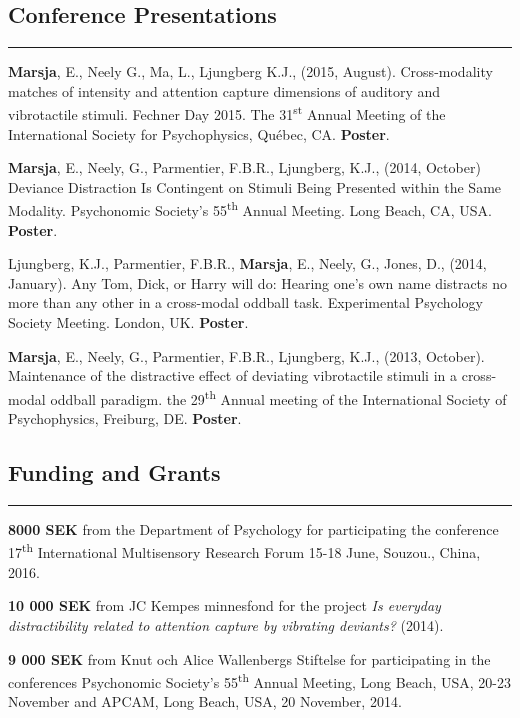 \documentclass[]{article}
\begin{document}
\subsection{Conference Presentations}\label{conference-presentations}

\hrule

\textbf{Marsja}, E., Neely G., Ma, L., Ljungberg K.J., (2015, August).
Cross-modality matches of intensity and attention capture dimensions of
auditory and vibrotactile stimuli. Fechner Day 2015. The
31\textsuperscript{st} Annual Meeting of the International Society for
Psychophysics, Québec, CA. \textbf{Poster}.

\textbf{Marsja}, E., Neely, G., Parmentier, F.B.R., Ljungberg, K.J.,
(2014, October) Deviance Distraction Is Contingent on Stimuli Being
Presented within the Same Modality. Psychonomic Society's
55\textsuperscript{th} Annual Meeting. Long Beach, CA, USA.
\textbf{Poster}.

Ljungberg, K.J., Parmentier, F.B.R., \textbf{Marsja}, E., Neely, G.,
Jones, D., (2014, January). Any Tom, Dick, or Harry will do: Hearing
one's own name distracts no more than any other in a cross-modal oddball
task. Experimental Psychology Society Meeting. London, UK.
\textbf{Poster}.

\textbf{Marsja}, E., Neely, G., Parmentier, F.B.R., Ljungberg, K.J.,
(2013, October). Maintenance of the distractive effect of deviating
vibrotactile stimuli in a cross-modal oddball paradigm. the
29\textsuperscript{th} Annual meeting of the International Society of
Psychophysics, Freiburg, DE. \textbf{Poster}.

\subsection{Funding and Grants}\label{funding-and-grants}

\hrule

\textbf{8000 SEK} from the Department of Psychology for participating
the conference 17\textsuperscript{th} International Multisensory
Research Forum 15-18 June, Souzou., China, 2016.

\textbf{10 000 SEK} from JC Kempes minnesfond for the project \emph{Is
everyday distractibility related to attention capture by vibrating
deviants?} (2014).

\textbf{9 000 SEK} from Knut och Alice Wallenbergs Stiftelse for
participating in the conferences Psychonomic Society's
55\textsuperscript{th} Annual Meeting, Long Beach, USA, 20-23 November
and APCAM, Long Beach, USA, 20 November, 2014.
\end{document}
